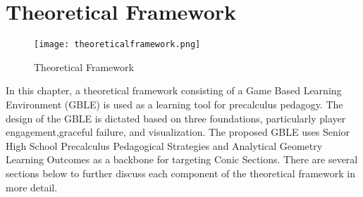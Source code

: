 %
%
%                 

\chapter{Theoretical Framework}
\begin{comment}
This chapter lists and discusses the specific steps and activities that will be performed by the proponent to accomplish the project. 
The discussion covers the activities from pre-proposal to Final Thesis Writing.  It also includes an initial discussion on the theoretical framework to be followed.
Research activities include inquiry, survey, research, brainstorming, canvassing, consultation, review, interview, observe, experiment, design, test, document, etc.  
The methodology also includes the following information:
\begin{itemize}
   \item who is responsible for the task
   \item the resource person to be contacted
   \item what will be done
   \item when and how long will the activity be done
   \item where will it be done
   \item why should be activity be done
\end{itemize}
\end{comment}

\begin{figure}[b]
   \centering                    
   \texttt{[image: theoreticalframework.png]}
   \caption{Theoretical Framework}
    \label{fig:theoreticalframework}
\end{figure}

In this chapter, a theoretical framework consisting of a Game Based Learning Environment (GBLE) is used as a learning tool for precalculus pedagogy. The design of the GBLE is dictated based on three foundations, particularly player engagement,graceful failure, and visualization. The proposed GBLE uses Senior High School Precalculus Pedagogical Strategies and Analytical Geometry Learning Outcomes as a backbone for targeting Conic Sections. There are several sections below to further discuss each component of the theoretical framework in more detail.

